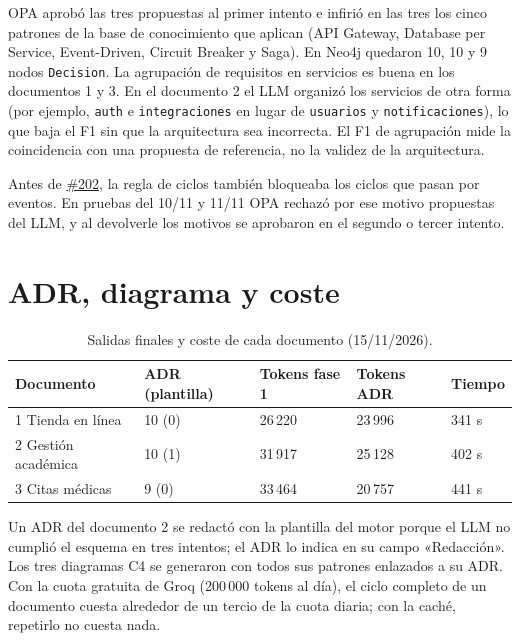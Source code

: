 \documentclass[11pt,a4paper]{report}
\newcommand{\pr}[1]{\href{https://github.com/PracticasESPE/Framework_Desarrollo_Seguro/pull/#1}{\##1}}
\begin{document}
OPA aprobó las tres propuestas al primer intento e infirió en las tres los cinco patrones de la
base de conocimiento que aplican (API Gateway, Database per Service, Event-Driven, Circuit Breaker
y Saga). En Neo4j quedaron 10, 10 y 9 nodos \texttt{Decision}. La agrupación de requisitos en
servicios es buena en los documentos 1 y 3. En el documento 2 el LLM organizó los servicios de
otra forma (por ejemplo, \texttt{auth} e \texttt{integraciones} en lugar de \texttt{usuarios} y
\texttt{notificaciones}), lo que baja el F1 sin que la arquitectura sea incorrecta. El F1 de
agrupación mide la coincidencia con una propuesta de referencia, no la validez de la arquitectura.

Antes de \pr{202}, la regla de ciclos también bloqueaba los ciclos que pasan por eventos. En
pruebas del 10/11 y 11/11 OPA rechazó por ese motivo propuestas del LLM, y al devolverle los
motivos se aprobaron en el segundo o tercer intento.

\section{ADR, diagrama y coste}

\begin{table}[H]
\centering
\caption{Salidas finales y coste de cada documento (15/11/2026).}
\begin{tabularx}{\textwidth}{@{}LC{2.4cm}C{2.4cm}C{2.4cm}C{1.7cm}@{}}
\toprule
\textbf{Documento} & \textbf{ADR (plantilla)} & \textbf{Tokens fase 1} & \textbf{Tokens ADR} & \textbf{Tiempo}\\
 Tienda en línea & 10 (0) & 26\,220 & 23\,996 & 341 s\\
2 Gestión académica & 10 (1) & 31\,917 & 25\,128 & 402 s\\
3 Citas médicas & 9 (0) & 33\,464 & 20\,757 & 441 s\\
\bottomrule
\end{tabularx}
\end{table}

Un ADR del documento 2 se redactó con la plantilla del motor porque el LLM no cumplió el esquema en
tres intentos; el ADR lo indica en su campo «Redacción». Los tres diagramas C4 se generaron con
todos sus patrones enlazados a su ADR. Con la cuota gratuita de Groq (200\,000 tokens al día), el
ciclo completo de un documento cuesta alrededor de un tercio de la cuota diaria; con la caché,
repetirlo no cuesta nada.

\end{document}
